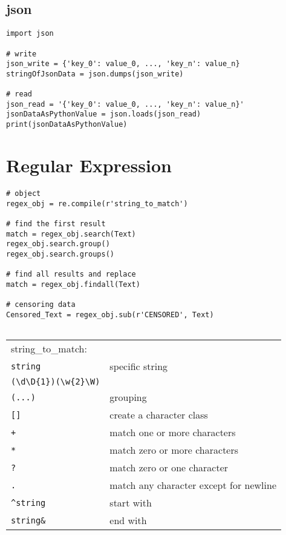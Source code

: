 \subsection{json}

\begin{verbatim}
import json

# write
json_write = {'key_0': value_0, ..., 'key_n': value_n}
stringOfJsonData = json.dumps(json_write)

# read
json_read = '{'key_0': value_0, ..., 'key_n': value_n}'
jsonDataAsPythonValue = json.loads(json_read)
print(jsonDataAsPythonValue)
\end{verbatim}



\section{Regular Expression}

\begin{verbatim}
# object
regex_obj = re.compile(r'string_to_match')

# find the first result
match = regex_obj.search(Text)
regex_obj.search.group()
regex_obj.search.groups()

# find all results and replace
match = regex_obj.findall(Text)

# censoring data
Censored_Text = regex_obj.sub(r'CENSORED', Text)
            
\end{verbatim}


\begin{tabular}{@{}ll@{}}
    string\_to\_match: \\
    \verb!string!    & specific string \\
    \verb!(\d\D{1})(\w{2}\W)!    &  \\
    \verb!(...)!    & grouping \\
    \verb![]!    & create a character class \\
    \verb!+!    & match one or more characters \\
    \verb!*!    & match zero or more characters \\
    \verb!?!    & match zero or one character \\
    \verb!.!    & match any character except for newline \\
    \verb!^string!    & start with \\
    \verb!string&!    & end with \\
\end{tabular}